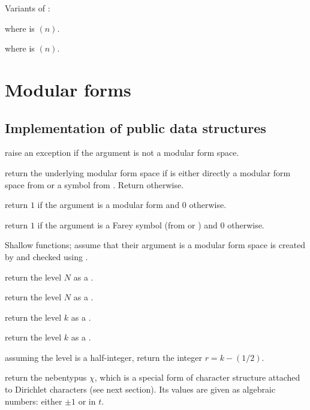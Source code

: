 Variants of  :


 where  is $(n)$.

 where  is $(n)$.

\chapter{Modular forms}

\section{Implementation of public data structures}

 raise an exception if the argument is not a
modular form space.

 return the underlying modular form space
if  is either directly a modular form space from 
or a symbol from . Return  otherwise.

 return $1$ if the argument is a modular form
and $0$ otherwise.

 return $1$ if the argument is a Farey symbol
(from  or ) and $0$ otherwise.


Shallow functions; assume that their argument is a modular form space
is created by  and checked using .

 return the level $N$ as a .

 return the level $N$ as a .

 return the level $k$ as a .

 return the level $k$ as a .

 assuming the level is a half-integer, return
the integer $r = k - (1/2)$.

 return the nebentypus $\chi$, which is a
 special form of character structure attached to Dirichlet characters (see
 next section). Its values are given as algebraic numbers: either $\pm1$ or
  in $t$.


